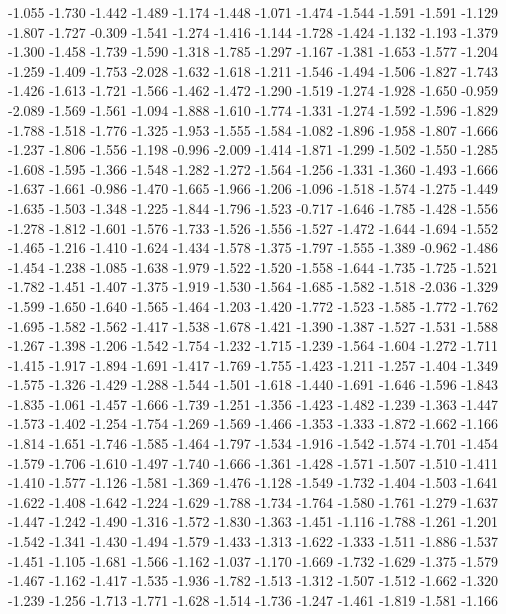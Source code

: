 \documentclass[9pt]{article}
\theoremstyle{plain}
\theoremstyle{definition}
\theoremstyle{remark}
\numberwithin{equation}{section}
\begin{document}
-1.055
-1.730
-1.442
-1.489
-1.174
-1.448
-1.071
-1.474
-1.544
-1.591
-1.591
-1.129
-1.807
-1.727
-0.309
-1.541
-1.274
-1.416
-1.144
-1.728
-1.424
-1.132
-1.193
-1.379
-1.300
-1.458
-1.739
-1.590
-1.318
-1.785
-1.297
-1.167
-1.381
-1.653
-1.577
-1.204
-1.259
-1.409
-1.753
-2.028
-1.632
-1.618
-1.211
-1.546
-1.494
-1.506
-1.827
-1.743
-1.426
-1.613
-1.721
-1.566
-1.462
-1.472
-1.290
-1.519
-1.274
-1.928
-1.650
-0.959
-2.089
-1.569
-1.561
-1.094
-1.888
-1.610
-1.774
-1.331
-1.274
-1.592
-1.596
-1.829
-1.788
-1.518
-1.776
-1.325
-1.953
-1.555
-1.584
-1.082
-1.896
-1.958
-1.807
-1.666
-1.237
-1.806
-1.556
-1.198
-0.996
-2.009
-1.414
-1.871
-1.299
-1.502
-1.550
-1.285
-1.608
-1.595
-1.366
-1.548
-1.282
-1.272
-1.564
-1.256
-1.331
-1.360
-1.493
-1.666
-1.637
-1.661
-0.986
-1.470
-1.665
-1.966
-1.206
-1.096
-1.518
-1.574
-1.275
-1.449
-1.635
-1.503
-1.348
-1.225
-1.844
-1.796
-1.523
-0.717
-1.646
-1.785
-1.428
-1.556
-1.278
-1.812
-1.601
-1.576
-1.733
-1.526
-1.556
-1.527
-1.472
-1.644
-1.694
-1.552
-1.465
-1.216
-1.410
-1.624
-1.434
-1.578
-1.375
-1.797
-1.555
-1.389
-0.962
-1.486
-1.454
-1.238
-1.085
-1.638
-1.979
-1.522
-1.520
-1.558
-1.644
-1.735
-1.725
-1.521
-1.782
-1.451
-1.407
-1.375
-1.919
-1.530
-1.564
-1.685
-1.582
-1.518
-2.036
-1.329
-1.599
-1.650
-1.640
-1.565
-1.464
-1.203
-1.420
-1.772
-1.523
-1.585
-1.772
-1.762
-1.695
-1.582
-1.562
-1.417
-1.538
-1.678
-1.421
-1.390
-1.387
-1.527
-1.531
-1.588
-1.267
-1.398
-1.206
-1.542
-1.754
-1.232
-1.715
-1.239
-1.564
-1.604
-1.272
-1.711
-1.415
-1.917
-1.894
-1.691
-1.417
-1.769
-1.755
-1.423
-1.211
-1.257
-1.404
-1.349
-1.575
-1.326
-1.429
-1.288
-1.544
-1.501
-1.618
-1.440
-1.691
-1.646
-1.596
-1.843
-1.835
-1.061
-1.457
-1.666
-1.739
-1.251
-1.356
-1.423
-1.482
-1.239
-1.363
-1.447
-1.573
-1.402
-1.254
-1.754
-1.269
-1.569
-1.466
-1.353
-1.333
-1.872
-1.662
-1.166
-1.814
-1.651
-1.746
-1.585
-1.464
-1.797
-1.534
-1.916
-1.542
-1.574
-1.701
-1.454
-1.579
-1.706
-1.610
-1.497
-1.740
-1.666
-1.361
-1.428
-1.571
-1.507
-1.510
-1.411
-1.410
-1.577
-1.126
-1.581
-1.369
-1.476
-1.128
-1.549
-1.732
-1.404
-1.503
-1.641
-1.622
-1.408
-1.642
-1.224
-1.629
-1.788
-1.734
-1.764
-1.580
-1.761
-1.279
-1.637
-1.447
-1.242
-1.490
-1.316
-1.572
-1.830
-1.363
-1.451
-1.116
-1.788
-1.261
-1.201
-1.542
-1.341
-1.430
-1.494
-1.579
-1.433
-1.313
-1.622
-1.333
-1.511
-1.886
-1.537
-1.451
-1.105
-1.681
-1.566
-1.162
-1.037
-1.170
-1.669
-1.732
-1.629
-1.375
-1.579
-1.467
-1.162
-1.417
-1.535
-1.936
-1.782
-1.513
-1.312
-1.507
-1.512
-1.662
-1.320
-1.239
-1.256
-1.713
-1.771
-1.628
-1.514
-1.736
-1.247
-1.461
-1.819
-1.581
-1.166
\end{document}
